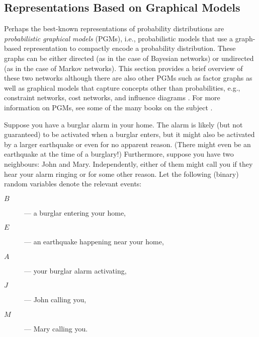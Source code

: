 \subsection{Representations Based on Graphical Models}\label{sec:pgms}

Perhaps the best-known representations of probability distributions are
\emph{probabilistic graphical models} (PGMs), i.e., probabilistic models that
use a graph-based representation to compactly encode a probability distribution.
These graphs can be either directed (as in the case of Bayesian networks) or
undirected (as in the case of Markov networks). This section provides a brief
overview of these two networks although there are also other PGMs such as factor
graphs \citep{DBLP:journals/spm/Loeliger04,DBLP:series/synthesis/2016Raedt} as
well as graphical models that capture concepts other than probabilities, e.g.,
constraint networks, cost networks, and influence diagrams
\citep{DBLP:series/synthesis/2019Dechter}. For more information on PGMs, see
some of the many books on the subject
\citep{DBLP:series/synthesis/2019Dechter,DBLP:books/daglib/0023091,DBLP:books/daglib/0066829}.

\begin{example}\label{example:bn}
  Suppose you have a burglar alarm in your home. The alarm is likely (but not
  guaranteed) to be activated when a burglar enters, but it might also be
  activated by a larger earthquake or even for no apparent reason. (There might
  even be an earthquake at the time of a burglary!) Furthermore, suppose you
  have two neighbours: John and Mary. Independently, either of them might call
  you if they hear your alarm ringing or for some other reason. Let the
  following (binary) random variables denote the relevant events:
  \begin{description}
  \item[$B$]--- a burglar entering your home,
  \item[$E$]--- an earthquake happening near your home,
  \item[$A$]--- your burglar alarm activating,
  \item[$J$]--- John calling you,
  \item[$M$]--- Mary calling you.
  \end{description}
\end{example}

